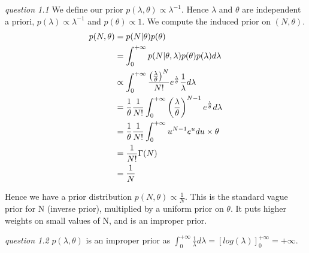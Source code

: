 \documentclass[twoside]{article}
\begin{document}
\vspace{.2 in}
\textit{question 1.1}
We define our prior $p(\lambda, \theta) \propto \lambda^{-1}$. Hence $\lambda$ and $\theta$ are independent a priori, $p(\lambda) \propto \lambda^{-1}$ and $p(\theta) \propto 1$. We compute the induced prior on $(N, \theta)$.
\begin{align*}
p(N, \theta) & = p(N | \theta) p(\theta)\\
& = \int_0^{+\infty} p(N | \theta, \lambda) p(\theta) p(\lambda) d\lambda\\
& \propto \int_0^{+\infty} \frac{\left(\frac{\lambda}{\theta}\right)^N}{N!} e^{\frac{\lambda}{\theta}} \frac{1}{\lambda} d\lambda\\
& = \frac{1}{\theta} \* \frac{1}{N!} \* \int_0^{+\infty} \left(\frac{\lambda}{\theta}\right)^{N - 1} e^{\frac{\lambda}{\theta}}  d\lambda\\
& =  \frac{1}{\theta} \* \frac{1}{N!} \* \int_0^{+\infty} u^{N - 1} e^{u} du \times \theta\\
& = \frac{1}{N!} \* \Gamma(N)\\
& = \frac{1}{N}
\end{align*}

Hence we have a prior distribution $p(N, \theta) \propto \frac{1}{N}$. This is the standard vague prior for N (inverse prior), multiplied by a uniform prior on $\theta$. It puts higher weights on small values of N, and is an improper prior.

\vspace{.2 in}
\textit{question 1.2} $p(\lambda, \theta)$ is an improper prior as $\int_0^{+\infty} \frac{1}{\lambda} d\lambda = [log(\lambda)]_0^{+\infty} =  +\infty$.
\end{document}
